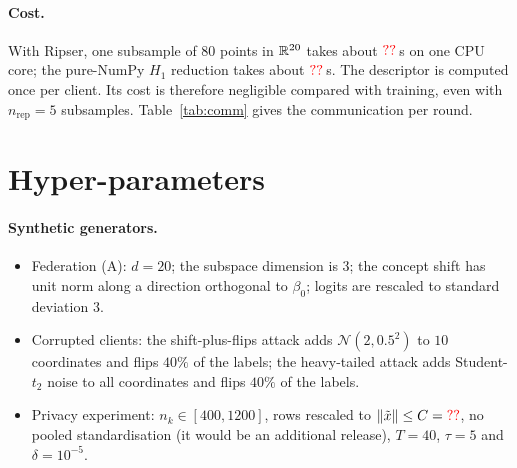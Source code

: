 \paragraph{Cost.} With Ripser, one subsample of $80$ points in $\mathbb{R}^{20}$ takes about
$\textcolor{red}{??}$\,s on one CPU core; the pure-NumPy $H_1$ reduction takes about
$\textcolor{red}{??}$\,s. The descriptor is computed once per client. Its cost is therefore
negligible compared with training, even with $n_{\mathrm{rep}}=5$ subsamples.
Table~\ref{tab:comm} gives the communication per round.

\begin{table}[h]
\centering\small
\caption{Communication per client and per round (in floats); $p$ is the model dimension.}
\label{tab:comm}
\end{table}

\section{Hyper-parameters}
\label{app:hparams}
\begin{table}[h]
\centering\small
\caption{Hyper-parameters, fixed before the experiments and shared by all federations.}
\label{tab:hparams}
\end{table}
\paragraph{Synthetic generators.}
\begin{itemize}[leftmargin=1.2em,itemsep=2pt]
  \item Federation (A): $d=20$; the subspace dimension is $3$; the concept shift has unit
    norm along a direction orthogonal to $\beta_0$; logits are rescaled to standard
    deviation $3$.
  \item Corrupted clients: the shift-plus-flips attack adds $\mathcal N(2,0.5^2)$ to $10$
    coordinates and flips $40\%$ of the labels; the heavy-tailed attack adds Student-$t_2$
    noise to all coordinates and flips $40\%$ of the labels.
  \item Privacy experiment: $n_k\in[400,1200]$, rows rescaled to $\left\lVert \tilde x \right\rVert\le C=\textcolor{red}{??}$,
    no pooled standardisation (it would be an additional release), $T=40$, $\tau=5$ and
    $\delta=10^{-5}$.
\end{itemize}

